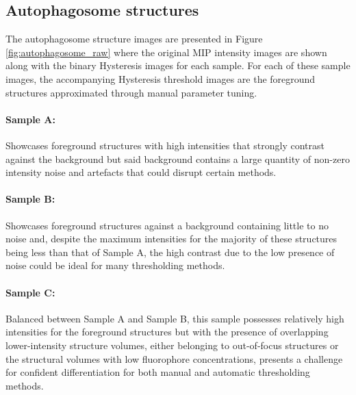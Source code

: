 \subsection{Autophagosome structures}
The autophagosome structure images are presented in Figure \ref{fig:autophagosome_raw} where the original MIP intensity images are shown along with the binary Hysteresis images for each sample. For each of these sample images, the accompanying Hysteresis threshold images are the foreground structures approximated through manual parameter tuning. \paragraph{Sample A:} Showcases foreground structures with high intensities that strongly contrast against the background but said background contains a large quantity of non-zero intensity noise and artefacts that could disrupt certain methods. \paragraph{Sample B:} Showcases foreground structures against a background containing little to no noise and, despite the maximum intensities for the majority of these structures being less than that of Sample A, the high contrast due to the low presence of noise could be ideal for many thresholding methods.\paragraph{Sample C:} Balanced between Sample A and Sample B, this sample possesses relatively high intensities for the foreground structures but with the presence of overlapping lower-intensity structure volumes, either belonging to out-of-focus structures or the structural volumes with low fluorophore concentrations, presents a challenge for confident differentiation for both manual and automatic thresholding methods.


